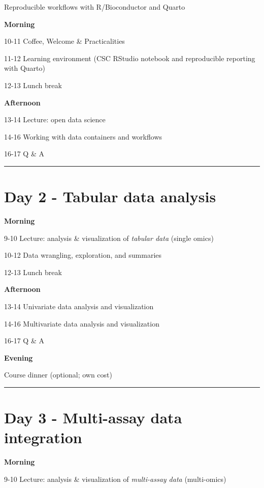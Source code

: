 \documentclass[
  oneside]{book}
\begin{document}
Reproducible workflows with R/Bioconductor and Quarto

\textbf{Morning}

10-11 Coffee, Welcome \& Practicalities

11-12 Learning environment (CSC RStudio notebook and reproducible reporting with Quarto)

12-13 Lunch break

\textbf{Afternoon}

13-14 Lecture: open data science

14-16 Working with data containers and workflows

16-17 Q \& A

\begin{center}\rule{0.5\linewidth}{0.5pt}\end{center}

\hypertarget{day-2---tabular-data-analysis}{%
\section{Day 2 - Tabular data analysis}\label{day-2---tabular-data-analysis}}

\textbf{Morning}

9-10 Lecture: analysis \& visualization of \emph{tabular data} (single omics)

10-12 Data wrangling, exploration, and summaries

12-13 Lunch break

\textbf{Afternoon}

13-14 Univariate data analysis and visualization

14-16 Multivariate data analysis and visualization

16-17 Q \& A

\textbf{Evening}

Course dinner (optional; own cost)

\begin{center}\rule{0.5\linewidth}{0.5pt}\end{center}

\hypertarget{day-3---multi-assay-data-integration}{%
\section{Day 3 - Multi-assay data integration}\label{day-3---multi-assay-data-integration}}

\textbf{Morning}

9-10 Lecture: analysis \& visualization of \emph{multi-assay data} (multi-omics)
\end{document}
